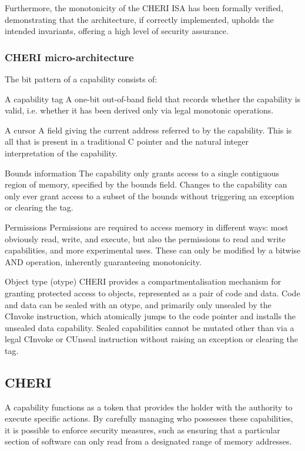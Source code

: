 Furthermore, the monotonicity of the CHERI ISA has been formally verified, demonstrating that the architecture, if correctly implemented, upholds the 
intended invariants, offering a high level of security assurance.

\subsubsection{CHERI micro-architecture}

The bit pattern of a capability consists of:

A capability tag A one-bit out-of-band field that records whether the capability is valid, i.e. whether it has been derived only 
via legal monotonic operations.

A cursor A field giving the current address referred to by the capability. This is all 
that is present in a traditional C pointer and the natural integer interpretation of the capability.

Bounds information The capability only grants access to a single contiguous region of memory, specified by the bounds field. Changes to the capability can only ever grant access 
to a subset of the bounds without triggering an exception or clearing the tag.

Permissions Permissions are required to access memory in different ways: most obviously read, write, and execute, but also the permissions to read and write capabilities, and more
experimental uses. These can only be modified by a bitwise AND operation, inherently guaranteeing monotonicity.

Object type (otype) CHERI provides a compartmentalisation mechanism for granting protected access to objects, represented as a 
pair of code and data. Code and data can be sealed with an otype, and primarily only unsealed by the CInvoke instruction, which atomically jumps to the code pointer and installs 
the unsealed data capability. Sealed capabilities cannot be mutated other than via a legal CInvoke or CUnseal instruction without 
raising an exception or clearing the tag.











\subsection{CHERI}
A capability functions as a token that provides the holder with the authority to 
execute specific actions. By carefully managing who possesses these capabilities, 
it is possible to enforce security measures, such as ensuring that a particular
section of software can only read from a designated range of memory addresses.


